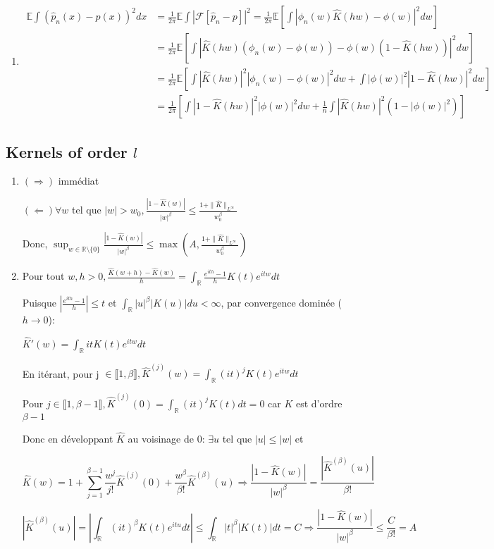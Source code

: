 \documentclass[10pt,a4paper,oneside]{article}
\begin{document}
\begin{enumerate}
\item
\begin{align*}
\mathbb{E} \int (\hat{p}_n(x) - p(x))^2 dx &= \frac{1}{2\pi} \mathbb{E} \int |\mathcal{F}[\hat{p}_n - p]|^2 = \frac{1}{2\pi} \mathbb{E} [\int |\phi_n(w) \hat{K}(hw) - \phi(w)|^2 dw] \\
&= \frac{1}{2\pi} \mathbb{E} [\int |\hat{K}(hw)(\phi_n(w) - \phi(w)) - \phi(w)(1 - \hat{K}(hw))|^2 dw] \\
&= \frac{1}{2\pi} \mathbb{E} [\int |\hat{K}(hw)|^2 |\phi_n(w) - \phi(w)|^2 dw + \int |\phi(w)|^2 |1 - \hat{K}(hw)|^2 dw] \\
&= \frac{1}{2\pi} [\int |1 - \hat{K}(hw)|^2 |\phi(w)|^2 dw + \frac{1}{n} \int |\hat{K}(hw)|^2 (1 - |\phi(w)|^2) ]
\end{align*}
\end{enumerate}

\subsection{Kernels of order $l$}

\begin{enumerate}
\item
$(\Rightarrow)$ immédiat

$(\Leftarrow) \forall w$ tel que $|w| > w_0, \frac{|1 - \hat{K}(w)|}{|w|^\beta} \leq \frac{1 + \| \hat{K} \|_{L^\infty}}{w_0 ^ \beta}$

Donc, $\sup_{w \in \mathbb{R} \setminus \{0\}} \frac{|1 - \hat{K}(w)|}{|w|^\beta} \leq \max(A,\frac{1 + \| \hat{K} \|_{L^\infty}}{w_0 ^ \beta})$

\item
Pour tout $w,h > 0, \frac{\hat{K}(w + h) - \hat{K}(w)}{h} = \int_\mathbb{R} \frac{e^{ith} - 1}{h} K(t) e^{itw} dt$

Puisque $| \frac{e^{ith} - 1}{h} | \leq t$ et $\int_\mathbb{R} |u|^\beta |K(u)| du < \infty$, par convergence dominée ($h \rightarrow 0$):

$\hat{K}'(w) = \int_\mathbb{R} it K(t) e^{itw} dt$

En itérant, pour j $\in \llbracket 1,\beta \rrbracket, \hat{K}^{(j)}(w) = \int_\mathbb{R} (it)^j K(t) e^{itw} dt$

Pour $j \in \llbracket 1, \beta - 1 \rrbracket, \hat{K}^{(j)}(0) = \int_\mathbb{R} (it)^j K(t) dt = 0$ car $K$ est d'ordre $\beta - 1$

Donc en développant $\hat{K}$ au voisinage de $0$: $\exists u$ tel que $|u| \leq |w|$ et

\[ \hat{K}(w) = 1 + \sum_{j = 1}^{\beta - 1} \frac{w^j}{j!} \hat{K}^{(j)}(0) + \frac{w ^ \beta}{\beta!} \hat{K}^{(\beta)}(u) \Rightarrow \frac{|1 - \hat{K}(w)|}{|w| ^ \beta} = \frac{|\hat{K}^{(\beta)}(u)|}{\beta!} \]

\[ |\hat{K}^{(\beta)}(u)| = | \int_\mathbb{R} (it)^\beta K(t) e^{itu} dt | \leq \int_\mathbb{R} |t|^\beta |K(t)| dt = C \Rightarrow \frac{|1 - \hat{K}(w)|}{|w| ^ \beta} \leq \frac{C}{\beta!} = A \]
\end{enumerate}
\end{document}
